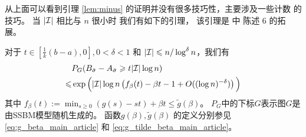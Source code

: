 从上面可以看到引理 \ref{lem:minus} 的证明并没有很多技巧性，主要涉及一些计数
的技巧。
当 $|\mathcal{I}|$ 相比与 $n$ 很小时
我们有如下的引理， 该引理是 \citet{ye2020exact} 中 陈述 6 的拓展。 

\begin{lemma}
  \label{lem:enhanced_fb}
	对于 $t\in [\frac{1}{k}(b-a), 0], 0<\delta <1$
	和 $ |\mathcal{I}| \leqslant n/\log^{\delta} n$，我们有
\begin{equation} \label{eq:upmpt}
	\begin{aligned}
	& P_G(B_{\bar{\sigma}}-A_{\bar{\sigma}}\geqslant t |\mathcal{I}| \log n)  \\
	\leqslant & \exp\Big(|\mathcal{I}|\log n
	\left(
    f_{\beta}(t) - \beta t -1	+ O((\log n)^{-\delta}) \right)\Big)
	\end{aligned}
	\end{equation}
	其中 $f_{\beta}(t) := \min_{s\geq 0} (g(s) - st) + \beta t \leq \tilde{g}(\beta) $。
  $P_G$中的下标$G$表示图$G$是由SSBM模型随机生成的。
  函数$g(\beta), \tilde{g}(\beta)$
  的定义分别参见
  \eqref{eq:g_beta_main_article}
  和
  \eqref{eq:g_tilde_beta_main_article}。
\end{lemma}

